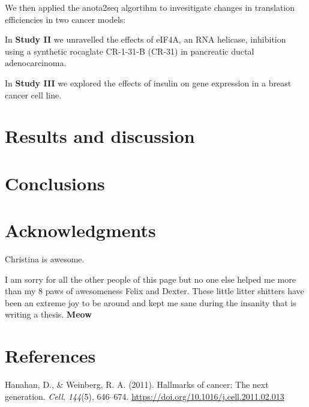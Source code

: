 \documentclass[12pt,openany]{book}
\begin{document}
We then applied the anota2seq algortihm to invesitigate changes in
translation efficiencies in two cancer models:

In \textbf{Study II} we unravelled the effects of eIF4A, an RNA
helicase, inhibition using a synthetic rocaglate CR-1-31-B (CR-31) in
pancreatic ductal adenocarcinoma.

In \textbf{Study III} we explored the effects of insulin on gene
expression in a breast cancer cell line.

\chapter{Results and discussion}

\chapter{Conclusions}

\chapter*{Acknowledgments}\label{acknowledgments}

Christina is awesome.

I am sorry for all the other people of this page but no one else helped
me more than my 8 paws of awesomeness Felix and Dexter. These little
litter shitters have been an extreme joy to be around and kept me sane
during the insanity that is writing a thesis. \textbf{Meow}

\chapter*{References}\label{references}

\hypertarget{refs}{}
\hypertarget{ref-Hanahan2011}{}
Hanahan, D., \& Weinberg, R. A. (2011). Hallmarks of cancer: The next
generation. \emph{Cell}, \emph{144}(5), 646--674.
\url{https://doi.org/10.1016/j.cell.2011.02.013}
\end{document}
